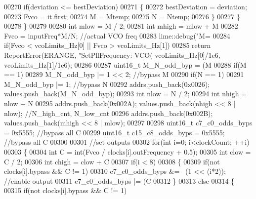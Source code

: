 \begin{DoxyCode}
{{{00270             \textcolor{keywordflow}{if}(deviation <= bestDeviation)
00271             \{
00272                 bestDeviation = deviation;
00273                 Fvco = it.first;
00274                 M = Mtemp;
00275                 N = Ntemp;
00276             \}
00277         \}
00278     \}
00279 
00280     \textcolor{keywordtype}{int} mlow = M / 2;
00281     \textcolor{keywordtype}{int} mhigh = mlow + M %
00282     Fvco = inputFreq*M/N; \textcolor{comment}{//actual VCO freq}
00283     lime::debug(\textcolor{stringliteral}{"M=%
00284     \textcolor{keywordflow}{if}(Fvco < vcoLimits\_Hz[0] || Fvco > vcoLimits\_Hz[1])
00285         \textcolor{keywordflow}{return} ReportError(ERANGE, \textcolor{stringliteral}{"SetPllFrequency: VCO(%
      vcoLimits\_Hz[0]/1e6, vcoLimits\_Hz[1]/1e6);
00286 
00287     uint16\_t M\_N\_odd\_byp = (M%
00288     \textcolor{keywordflow}{if}(M == 1)
00289         M\_N\_odd\_byp |= 1 << 2; \textcolor{comment}{//bypass M}
00290     \textcolor{keywordflow}{if}(N == 1)
00291         M\_N\_odd\_byp |= 1; \textcolor{comment}{//bypass N}
00292     addrs.push\_back(0x0026); values.push\_back(M\_N\_odd\_byp);
00293     \textcolor{keywordtype}{int} nlow = N / 2;
00294     \textcolor{keywordtype}{int} nhigh = nlow + N %
00295     addrs.push\_back(0x002A); values.push\_back(nhigh << 8 | nlow); \textcolor{comment}{//N\_high\_cnt, N\_low\_cnt}
00296     addrs.push\_back(0x002B); values.push\_back(mhigh << 8 | mlow);
00297 
00298     uint16\_t c7\_c0\_odds\_byps = 0x5555; \textcolor{comment}{//bypass all C}
00299     uint16\_t c15\_c8\_odds\_byps = 0x5555; \textcolor{comment}{//bypass all C}
00300 
00301     \textcolor{comment}{//set outputs}
00302     \textcolor{keywordflow}{for}(\textcolor{keywordtype}{int} i=0; i<clockCount; ++i)
00303     \{
00304         \textcolor{keywordtype}{int} C = int(Fvco / clocks[i].outFrequency + 0.5);
00305         \textcolor{keywordtype}{int} clow = C / 2;
00306         \textcolor{keywordtype}{int} chigh = clow + C %
00307         \textcolor{keywordflow}{if}(i < 8)
00308         \{
00309             \textcolor{keywordflow}{if}(not clocks[i].bypass && C != 1)
00310                 c7\_c0\_odds\_byps &= ~(1 << (i*2)); \textcolor{comment}{//enable output}
00311             c7\_c0\_odds\_byps |= (C %
00312         \}
00313         \textcolor{keywordflow}{else}
00314         \{
00315             \textcolor{keywordflow}{if}(not clocks[i].bypass && C != 1)
}}}}}
\end{DoxyCode}

